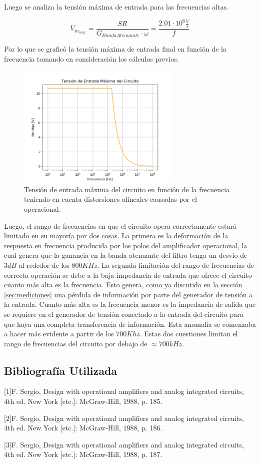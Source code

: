 Luego se analiza la tensión máxima de entrada para las frecuencias altas.

\begin{equation}
	V_{in_{max}} = \frac{SR}{G_{Banda Atenuante}\cdot \omega} = \frac{2.01\cdot 10^6\frac{V}{s}}{f}
\end{equation}

Por lo que se graficó la tensión máxima de entrada final en función de la frecuencia tomando en consideración los cálculos previos.

\begin{figure} [H]
	\centering
	\includegraphics[width=0.7\textwidth]{Imagenes/vin_max.PNG}
	\caption{Tensión de entrada máxima del circuito en función de la frecuencia teniendo en cuenta distorsiones alineales causadas por el operacional.}
	\label{fig:vin_max}
\end{figure}

Luego, el rango de frecuencias en que el circuito opera correctamente estará limitado en su mayoría por dos cosas. La primera es la deformación de la respuesta en frecuencia producida por los polos del amplificador operacional, la cual genera que la ganancia en la banda atenuante del filtro tenga un desvío de $3dB$ al rededor de los $800KHz$. La segunda limitación del rango de frecuencias de correcta operación se debe a la baja impedancia de entrada que ofrece el circuito cuanto más alta es la frecuencia. Esto genera, como ya discutido en la sección \ref{sec:mediciones} una pérdida de información por parte del generador de tensión a la entrada. Cuanto más alta es la frecuencia menor es la impedancia de salida que se requiere en el generador de tensión conectado a la entrada del circuito para que haya una completa transferencia de información. Esta anomalía se comenzaba a hacer más evidente a partir de los $700Khz$. Estas dos cuestiones limitan el rango de frecuencias del circuito por debajo de $\approx 700kHz$.


\subsection{Bibliografía Utilizada}
[1]F. Sergio, Design with operational amplifiers and analog integrated circuits, 4th ed. New York [etc.]: McGraw-Hill, 1988, p. 185.

[2]F. Sergio, Design with operational amplifiers and analog integrated circuits, 4th ed. New York [etc.]: McGraw-Hill, 1988, p. 186.

[3]F. Sergio, Design with operational amplifiers and analog integrated circuits, 4th ed. New York [etc.]: McGraw-Hill, 1988, p. 187.


